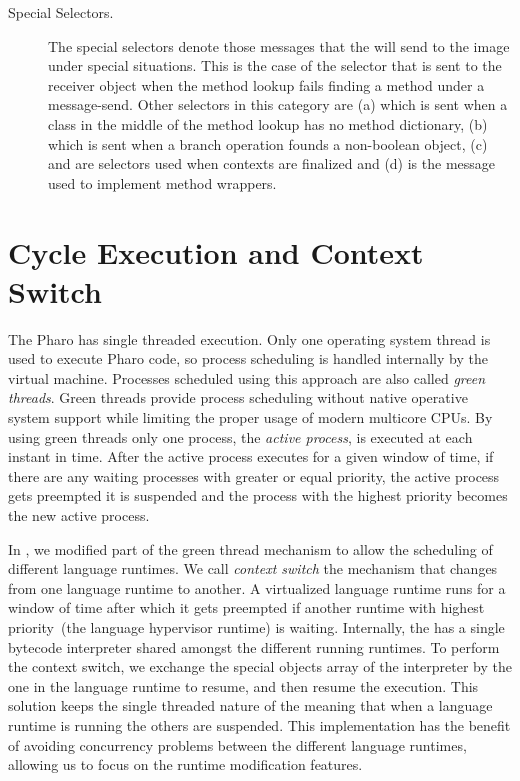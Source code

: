 \begin{description}
\item[Special Selectors.] The special selectors denote those messages that the \VM will send to the image under special situations. This is the case of the  selector that is sent to the receiver object when the method lookup fails finding a method under a message-send. Other selectors in this category are (a)  which is sent when a class in the middle of the method lookup has no method dictionary, (b)  which is sent when a branch operation founds a non-boolean object, (c)  and  are selectors used when contexts are finalized and (d)  is the message used to implement method wrappers.

\end{description}




\section{Cycle Execution and Context Switch} \label{sec:context_switch}

The Pharo \VM has single threaded execution. Only one operating system thread is used to execute Pharo code, so process scheduling is handled internally by the virtual machine. Processes scheduled using this approach are also called \emph{green threads}. Green threads provide process scheduling without native operative system support while limiting the proper usage of modern multicore CPUs. By using green threads only one process, the \emph{active process}, is executed at each instant in time. After the active process executes for a given window of time, if there are any waiting processes with greater or equal priority, the active process gets preempted \ie it is suspended and the process with the highest priority becomes the new active process.

In \Vtt, we modified part of the green thread mechanism to allow the scheduling of different language runtimes. We call \emph{context switch} the mechanism that changes from one language runtime to another. A virtualized language runtime runs for a window of time after which it gets preempted if another runtime with highest priority~(the language hypervisor runtime) is waiting. Internally, the \VM has a single bytecode interpreter shared amongst the different running runtimes. To perform the context switch, we exchange the special objects array of the \VM interpreter by the one in the language runtime to resume, and then resume the \VM execution. This solution keeps the single threaded nature of the \VM meaning that when a language runtime is running the others are suspended. This implementation has the benefit of avoiding concurrency problems between the different language runtimes, allowing us to focus on the runtime modification features.


